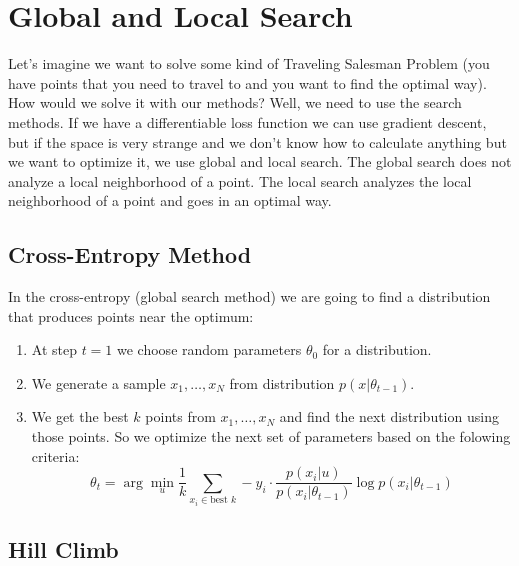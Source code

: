 \chapter{Global and Local Search}

{\sf Let's imagine we want to solve some kind of Traveling Salesman Problem (you have points that you need to travel to and you want to find the optimal way). How would we solve it with our methods? Well, we need to use the search methods. If we have a differentiable loss function we can use gradient descent, but if the space is very strange and we don't know how to calculate anything but we want to optimize it, we use global and local search. The global search does not analyze a local neighborhood of a point. The local search analyzes the local neighborhood of a point and goes in an optimal way.}

\section{Cross-Entropy Method}

In the cross-entropy (global search method) we are going to find a distribution that produces points near the optimum:
\begin{enumerate}
	\item At step $t=1$ we choose random parameters $\theta_0$ for a distribution.
	\item We generate a sample $x_1,\ldots,x_N$ from distribution $p(x|\theta_{t-1})$.
	\item We get the best $k$ points from $x_1,\ldots,x_N$ and find the next distribution using those points. So we optimize the next set of parameters based on the folowing criteria:
	$$\theta_t=\arg\min\limits_{u}\frac{1}{k}\sum\limits_{x_i\in \text{best }k}-y_i\cdot\frac{p(x_i|u)}{p(x_i|\theta_{t-1})}\log p(x_i| \theta_{t-1})$$
\end{enumerate}

\section{Hill Climb}

